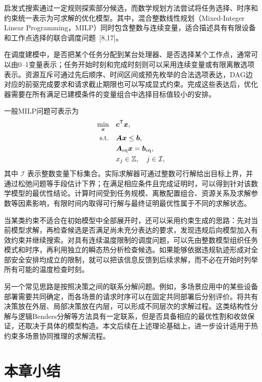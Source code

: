 启发式搜索通过一定规则探索部分候选，而数学规划方法尝试将任务选择、时序和约束统一表示为可求解的优化模型。其中，混合整数线性规划（Mixed-Integer Linear Programming，MILP）同时包含整数与连续变量，适合描述具有有限设备和工作点选择的联合调度问题~[8,17]。

在调度建模中，是否把某个任务分配到某台处理器、是否选择某个工作点，通常可以由0--1变量表示；任务开始时刻和完成时刻则可以采用连续变量或有限离散选项表示。资源互斥可通过先后顺序、时间区间或预先枚举的合法选项表达，DAG边对应的前驱完成要求和请求截止期限也可以写成显式约束。完成这些表达后，优化器需要在所有满足已建模条件的变量组合中选择目标值较小的安排。

一般MILP问题可表示为
\begin{equation}\label{eq:ch2-milp}
 \begin{aligned}
  \min_{\boldsymbol x}\quad &\boldsymbol c^{\mathsf T}\boldsymbol x,\\
  \text{s.t.}\quad &\boldsymbol A\boldsymbol x\le\boldsymbol b,\\
   &\boldsymbol A_{\rm eq}\boldsymbol x=\boldsymbol b_{\rm eq},\\
   &x_j\in\mathbb Z,\quad j\in\mathcal I,
 \end{aligned}
\end{equation}
其中 $\mathcal I$ 表示整数变量下标集合。实际求解器可通过整数可行解给出目标上界，并通过松弛问题等手段估计下界；在满足相应条件且完成证明时，可以得到针对该数学模型的最优性结论。计算时间受到任务规模、离散配置组合、资源关系及求解参数等因素影响，有限时间内取得可行解与最终证明最优性属于不同的求解状态。

当某类约束不适合在初始模型中全部展开时，还可以采用约束生成的思路：先对当前模型求解，再检查候选是否满足尚未充分表达的要求，发现违规后向模型加入有效约束并继续搜索。对具有连续温度限制的调度问题，可以先由整数模型组织任务模式和时序，再利用独立的瞬态热分析检查候选。如果能够依据违规轨迹形成对全部安全安排均成立的限制，就可以把该信息反馈到后续求解，而不必在开始时列举所有可能的温度检查时刻。

另一个常见思路是按照决策之间的联系分解问题。例如，多场景应用中的某些设备部署需要共同确定，而各场景的请求时序可以在固定共同部署后分别评价。将共有决策放在外层、局部决策放在内层，可以形成不同层次的求解过程。这类结构性分解与逻辑Benders分解等方法具有一定联系，但是否具备相应的最优性割和收敛保证，还取决于具体的模型构造。本文后续在上述理论基础上，进一步设计适用于热约束多场景协同推理的求解流程。

\section{本章小结}

